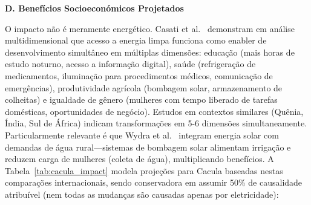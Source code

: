 \documentclass[12pt, a4paper]{article}
\begin{document}
{{{{{{{{{{{{\textbf{D. Benefícios Socioeconómicos Projetados}

O impacto não é meramente energético. Casati et al.~\citep{Casati2023} demonstram em análise multidimensional que acesso a energia limpa funciona como enabler de desenvolvimento simultâneo em múltiplas dimensões: educação (mais horas de estudo noturno, acesso a informação digital), saúde (refrigeração de medicamentos, iluminação para procedimentos médicos, comunicação de emergências), produtividade agrícola (bombagem solar, armazenamento de colheitas) e igualdade de gênero (mulheres com tempo liberado de tarefas domésticas, oportunidades de negócio). Estudos em contextos similares (Quênia, Índia, Sul de África) indicam transformações em 5-6 dimensões simultaneamente. Particularmente relevante é que Wydra et al.~\citep{Wydra2019} integram energia solar com demandas de água rural—sistemas de bombagem solar alimentam irrigação e reduzem carga de mulheres (coleta de água), multiplicando benefícios. A Tabela~\ref{tab:cacula_impact} modela projeções para Cacula baseadas nestas comparações internacionais, sendo conservadora em assumir 50\% de causalidade atribuível (nem todas as mudanças são causadas apenas por eletricidade):

}}}}}}}}}}}}
\end{document}
